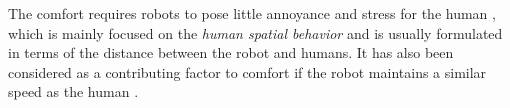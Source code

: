 \documentclass[journal]{IEEEtran}
\newcommand{\todohere}[1]{\hl{(\textbf{TODO:} #1)}}
\begin{document}
The comfort requires robots to pose little annoyance and stress for the human \cite{kruse2013human}, which is mainly focused on the \textit{human spatial behavior} \cite{aiello1987human} and is usually formulated in terms of the distance between the robot and humans.
It has also been considered as a contributing factor to comfort if the robot maintains a similar speed as the human \cite{henry2010learning}.
	
	
\end{document}
